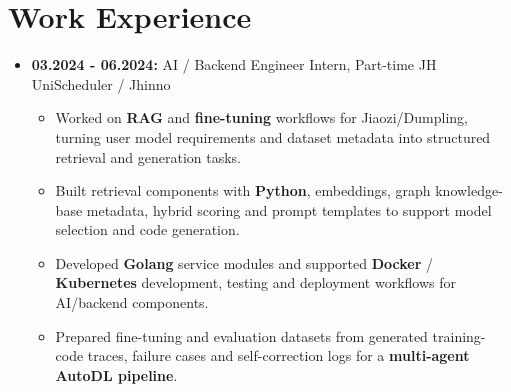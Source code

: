 \documentclass[10pt,a4paper]{article}
\newcommand{\cvright}[1]{\hfill{\normalfont #1}}
\newcommand{\cvrole}[3]{%
  \item \textbf{#1:} #2 \cvright{#3}
}
\begin{document}
\section*{Work Experience}
\begin{itemize}
  \cvrole{03.2024 - 06.2024}{AI / Backend Engineer Intern, Part-time}{JH UniScheduler / Jhinno}
    \begin{itemize}
      \item Worked on \textbf{RAG} and \textbf{fine-tuning} workflows for Jiaozi/Dumpling, turning user model requirements and dataset metadata into structured retrieval and generation tasks.
      \item Built retrieval components with \textbf{Python}, embeddings, graph knowledge-base metadata, hybrid scoring and prompt templates to support model selection and code generation.
      \item Developed \textbf{Golang} service modules and supported \textbf{Docker} / \textbf{Kubernetes} development, testing and deployment workflows for AI/backend components.
      \item Prepared fine-tuning and evaluation datasets from generated training-code traces, failure cases and self-correction logs for a \textbf{multi-agent AutoDL pipeline}.
    \end{itemize}
\end{itemize}
\end{document}
